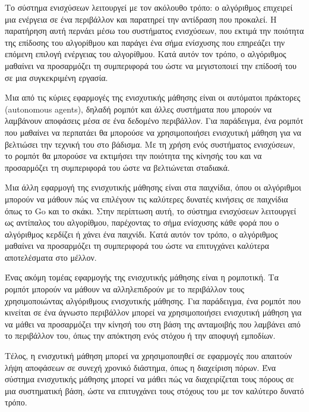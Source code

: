 Το σύστημα ενισχύσεων λειτουργεί με τον ακόλουθο τρόπο: ο αλγόριθμος επιχειρεί μια ενέργεια σε ένα περιβάλλον και παρατηρεί την αντίδραση που προκαλεί. Η παρατήρηση αυτή περνάει μέσω του συστήματος ενισχύσεων, που εκτιμά την ποιότητα της επίδοσης του αλγορίθμου και παράγει ένα σήμα ενίσχυσης που επηρεάζει την επόμενη επιλογή ενέργειας του αλγορίθμου. Κατά αυτόν τον τρόπο, ο αλγόριθμος μαθαίνει να προσαρμόζει τη συμπεριφορά του ώστε να μεγιστοποιεί την επίδοσή του σε μια συγκεκριμένη εργασία.

Μια από τις κύριες εφαρμογές της ενισχυτικής μάθησης είναι οι αυτόματοι πράκτορες (autonomous agents), δηλαδή ρομπότ και άλλες συστήματα που μπορούν να λαμβάνουν αποφάσεις μέσα σε ένα δεδομένο περιβάλλον. Για παράδειγμα, ένα ρομπότ που μαθαίνει να περπατάει θα μπορούσε να χρησιμοποιήσει ενισχυτική μάθηση για να βελτιώσει την τεχνική του στο βάδισμα. Με τη χρήση ενός συστήματος ενισχύσεων, το ρομπότ θα μπορούσε να εκτιμήσει την ποιότητα της κίνησής του και να προσαρμόζει τη συμπεριφορά του ώστε να βελτιώνεται σταδιακά.

Μια άλλη εφαρμογή της ενισχυτικής μάθησης είναι στα παιχνίδια, όπου οι αλγόριθμοι μπορούν να μάθουν πώς να επιλέγουν τις καλύτερες δυνατές κινήσεις σε παιχνίδια όπως το Go και το σκάκι. Στην περίπτωση αυτή, το σύστημα ενισχύσεων λειτουργεί ως αντίπαλος του αλγορίθμου, παρέχοντας το σήμα ενίσχυσης κάθε φορά που ο αλγόριθμος κερδίζει ή χάνει ένα παιχνίδι. Κατά αυτόν τον τρόπο, ο αλγόριθμος μαθαίνει να προσαρμόζει τη συμπεριφορά του ώστε να επιτυγχάνει καλύτερα αποτελέσματα στο μέλλον.

Ένας ακόμη τομέας εφαρμογής της ενισχυτικής μάθησης είναι η ρομποτική. Τα ρομπότ μπορούν να μάθουν να αλληλεπιδρούν με το περιβάλλον τους χρησιμοποιώντας αλγόριθμους ενισχυτικής μάθησης. Για παράδειγμα, ένα ρομπότ που κινείται σε ένα άγνωστο περιβάλλον μπορεί να χρησιμοποιήσει ενισχυτική μάθηση για να μάθει να προσαρμόζει την κίνησή του στη βάση της ανταμοιβής που λαμβάνει από το περιβάλλον του, όπως την απόκτηση ενός στόχου ή την αποφυγή εμποδίων.

Τέλος, η ενισχυτική μάθηση μπορεί να χρησιμοποιηθεί σε εφαρμογές που απαιτούν λήψη αποφάσεων σε συνεχή χρονικό διάστημα, όπως η διαχείριση πόρων. Ένα σύστημα ενισχυτικής μάθησης μπορεί να μάθει πώς να διαχειρίζεται τους πόρους σε μια συστηματική βάση, ώστε να επιτυγχάνει τους στόχους του με τον καλύτερο δυνατό τρόπο.

